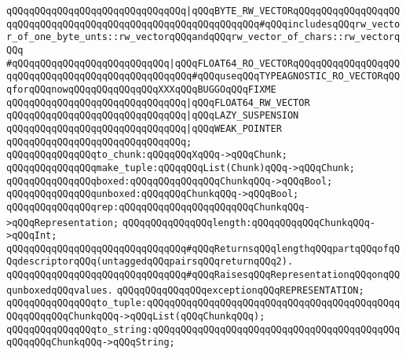 \verb|qQQqqQQqqQQqqQQqqQQqqQQqqQQqqQQq|\verb#|qQQqBYTE_RW_VECTORqQQqqQQqqQQqqQQqqQQqqQQqqQQqqQQqqQQqqQQqqQQqqQQqqQQqqQQqqQQqqQQq#\verb|#qQQqincludesqQQqrw_vector_of_one_byte_unts::rw_vectorqQQqandqQQqrw_vector_of_chars::rw_vectorqQQq|\newline
\verb|#qQQqqQQqqQQqqQQqqQQqqQQqqQQq|\verb#|qQQqFLOAT64_RO_VECTORqQQqqQQqqQQqqQQqqQQqqQQqqQQqqQQqqQQqqQQqqQQqqQQqqQQq#\verb|#qQQquseqQQqTYPEAGNOSTIC_RO_VECTORqQQqforqQQqnowqQQqqQQqqQQqqQQqXXXqQQqBUGGOqQQqFIXME|\newline
\verb|qQQqqQQqqQQqqQQqqQQqqQQqqQQqqQQq|\verb#|qQQqFLOAT64_RW_VECTOR#\newline
\verb|qQQqqQQqqQQqqQQqqQQqqQQqqQQqqQQq|\verb#|qQQqLAZY_SUSPENSION#\newline
\verb|qQQqqQQqqQQqqQQqqQQqqQQqqQQqqQQq|\verb#|qQQqWEAK_POINTER#\newline
\verb|qQQqqQQqqQQqqQQqqQQqqQQqqQQqqQQq;|\newline
\newline
\verb|qQQqqQQqqQQqqQQqto_chunk:qQQqqQQqXqQQq->qQQqChunk;|\newline
\newline
\verb|qQQqqQQqqQQqqQQqmake_tuple:qQQqqQQqList(Chunk)qQQq->qQQqChunk;|\newline
\newline
\verb|qQQqqQQqqQQqqQQqboxed:qQQqqQQqqQQqqQQqChunkqQQq->qQQqBool;|\newline
\verb|qQQqqQQqqQQqqQQqunboxed:qQQqqQQqChunkqQQq->qQQqBool;|\newline
\verb|qQQqqQQqqQQqqQQqrep:qQQqqQQqqQQqqQQqqQQqqQQqChunkqQQq->qQQqRepresentation;|\newline
\newline
\verb|qQQqqQQqqQQqqQQqlength:qQQqqQQqqQQqChunkqQQq->qQQqInt;|\newline
\verb|qQQqqQQqqQQqqQQqqQQqqQQqqQQqqQQq#qQQqReturnsqQQqlengthqQQqpartqQQqofqQQqdescriptorqQQq(untaggedqQQqpairsqQQqreturnqQQq2).|\newline
\verb|qQQqqQQqqQQqqQQqqQQqqQQqqQQqqQQq#qQQqRaisesqQQqRepresentationqQQqonqQQqunboxedqQQqvalues.|\newline
\newline
\newline
\verb|qQQqqQQqqQQqqQQqexceptionqQQqREPRESENTATION;|\newline
\newline
\verb|qQQqqQQqqQQqqQQqto_tuple:qQQqqQQqqQQqqQQqqQQqqQQqqQQqqQQqqQQqqQQqqQQqqQQqqQQqqQQqChunkqQQq->qQQqList(qQQqChunkqQQq);|\newline
\verb|qQQqqQQqqQQqqQQqto_string:qQQqqQQqqQQqqQQqqQQqqQQqqQQqqQQqqQQqqQQqqQQqqQQqqQQqChunkqQQq->qQQqString;|\newline

